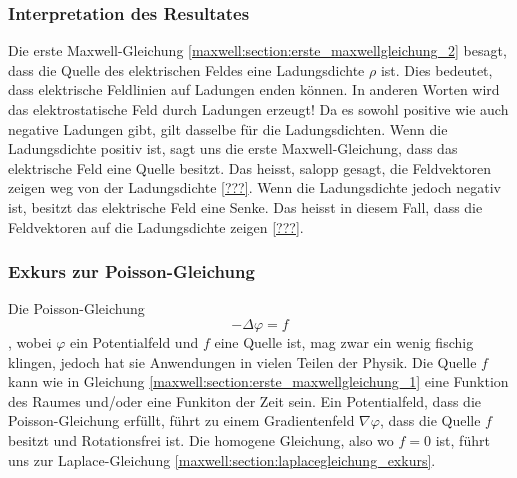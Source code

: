 \subsubsection{Interpretation des Resultates}
Die erste Maxwell-Gleichung \eqref{maxwell:section:erste_maxwellgleichung_2} besagt, dass die Quelle des elektrischen Feldes eine Ladungsdichte $\rho$ ist.
Dies bedeutet, dass elektrische Feldlinien auf Ladungen enden können.
In anderen Worten wird das elektrostatische Feld durch Ladungen erzeugt!
Da es sowohl positive wie auch negative Ladungen gibt, gilt dasselbe für die Ladungsdichten.
Wenn die Ladungsdichte positiv ist, sagt uns die erste Maxwell-Gleichung, dass das elektrische Feld eine Quelle besitzt.
Das heisst, salopp gesagt, die Feldvektoren zeigen weg von der Ladungsdichte \ref{???}.
Wenn die Ladungsdichte jedoch negativ ist, besitzt das elektrische Feld eine Senke.
Das heisst in diesem Fall, dass die Feldvektoren auf die Ladungsdichte zeigen \ref{???}.

\subsubsection{Exkurs zur Poisson-Gleichung}
Die Poisson-Gleichung
\[
-\Delta\varphi
=
f
\]
, wobei $\varphi$ ein Potentialfeld und $f$ eine Quelle ist, mag zwar ein wenig fischig klingen, jedoch hat sie Anwendungen in vielen Teilen der Physik.
Die Quelle $f$ kann wie in Gleichung \eqref{maxwell:section:erste_maxwellgleichung_1} eine Funktion des Raumes und/oder eine Funkiton der Zeit sein.
Ein Potentialfeld, dass die Poisson-Gleichung erfüllt, führt zu einem Gradientenfeld $\nabla\varphi$, dass die Quelle $f$ besitzt und Rotationsfrei ist.
Die homogene Gleichung, also wo $f = 0$ ist, führt uns zur Laplace-Gleichung \ref{maxwell:section:laplacegleichung_exkurs}.







